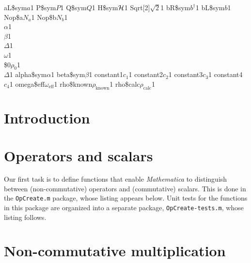 \documentclass[12pt,letterpaper]{refart}
\begin{document}
{{aL\$sym}{{\ensuremath{a}}}1
{P\$sym}{{\ensuremath{P}}}1
{Q\$sym}{{\ensuremath{Q}}}1
{H\$sym}{{\ensuremath{{\cal H}}}}1
{Sqrt[2]}{{\ensuremath{\sqrt{2}}}}1
{bR\$sym}{{\ensuremath{b^{\dagger}}}}1
{bL\$sym}{{\ensuremath{b}}}1
{Nop\$a}{{\ensuremath{N_a}}}1
{Nop\$b}{{\ensuremath{N_b}}}1
{\\[Alpha]}{{\ensuremath{\alpha}}}1
{\\[Beta]}{{\ensuremath{\beta}}}1
{\\[Delta]}{{\ensuremath{\Delta}}}1
{\\[Omega]}{{\ensuremath{\omega}}}1
{\\[Rho]\$0}{{\ensuremath{\rho_{0}}}}1
{\\[CapitalDelta]}{{\ensuremath{\Delta}}}1
{alpha\$sym}{{\ensuremath{\alpha}}}1
{beta\$sym}{{\ensuremath{\beta}}}1
{constant1}{{\ensuremath{c_1}}}1
{constant2}{{\ensuremath{c_2}}}1
{constant3}{{\ensuremath{c_3}}}1
{constant4}{{\ensuremath{c_4}}}1
{omega\$eff}{{\ensuremath{\omega_{\text{eff}}}}}1
{rho\$known}{{\ensuremath{\rho_{\text{known}}}}}1
{rho\$calc}{{\ensuremath{\rho_{\text{calc}}}}}1
}

\section{Introduction}



\clearpage
\section{Operators and scalars}

Our first task is to define functions that enable \emph{Mathematica} to distinguish between (non-commutative) operators and (commutative) scalars.  This is done in the \verb+OpCreate.m+ package, whose listing appears below.  Unit tests for the functions in this package are organized into a separate package, \verb+OpCreate-tests.m+, whose listing follows. 




\section{Non-commutative multiplication}
\end{document}
